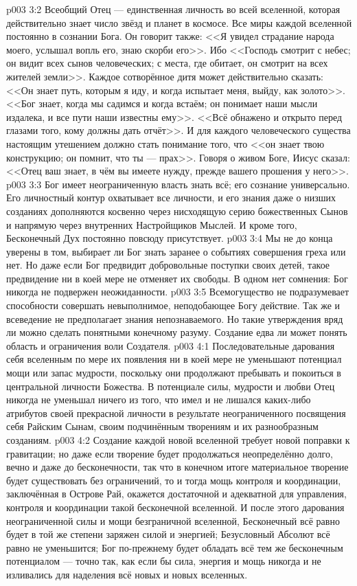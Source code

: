 \vs p003 3:2 Всеобщий Отец --- единственная личность во всей вселенной, которая действительно знает число звёзд и планет в космосе. Все миры каждой вселенной постоянно в сознании Бога. Он говорит также: <<Я увидел страдание народа моего, услышал вопль его, знаю скорби его>>. Ибо <<Господь смотрит с небес; он видит всех сынов человеческих; с места, где обитает, он смотрит на всех жителей земли>>. Каждое сотворённое дитя может действительно сказать: <<Он знает путь, которым я иду, и когда испытает меня, выйду, как золото>>. <<Бог знает, когда мы садимся и когда встаём; он понимает наши мысли издалека, и все пути наши известны ему>>. <<Всё обнажено и открыто перед глазами того, кому должны дать отчёт>>. И для каждого человеческого существа настоящим утешением должно стать понимание того, что <<он знает твою конструкцию; он помнит, что ты --- прах>>. Говоря о живом Боге, Иисус сказал: <<Отец ваш знает, в чём вы имеете нужду, прежде вашего прошения у него>>.
\vs p003 3:3 Бог имеет неограниченную власть знать всё; его сознание универсально. Его личностный контур охватывает все личности, и его знания даже о низших созданиях дополняются косвенно через нисходящую серию божественных Сынов и напрямую через внутренних Настройщиков Мыслей. И кроме того, Бесконечный Дух постоянно повсюду присутствует.
\vs p003 3:4 Мы не до конца уверены в том, выбирает ли Бог знать заранее о событиях совершения греха или нет. Но даже если Бог предвидит добровольные поступки своих детей, такое предвидение ни в коей мере не отменяет их свободы. В одном нет сомнения: Бог никогда не подвержен неожиданности.
\vs p003 3:5 \pc Всемогущество не подразумевает способности совершать невыполнимое, неподобающее Богу действие. Так же и всеведение не предполагает знания непознаваемого. Но такие утверждения вряд ли можно сделать понятными конечному разуму. Создание едва ли может понять область и ограничения воли Создателя.
\vs p003 4:1 Последовательные дарования себя вселенным по мере их появления ни в коей мере не уменьшают потенциал мощи или запас мудрости, поскольку они продолжают пребывать и покоиться в центральной личности Божества. В потенциале силы, мудрости и любви Отец никогда не уменьшал ничего из того, что имел и не лишался каких\hyp{}либо атрибутов своей прекрасной личности в результате неограниченного посвящения себя Райским Сынам, своим подчинённым творениям и их разнообразным созданиям.
\vs p003 4:2 Создание каждой новой вселенной требует новой поправки к гравитации; но даже если творение будет продолжаться неопределённо долго, вечно и даже до бесконечности, так что в конечном итоге материальное творение будет существовать без ограничений, то и тогда мощь контроля и координации, заключённая в Острове Рай, окажется достаточной и адекватной для управления, контроля и координации такой бесконечной вселенной. И после этого дарования неограниченной силы и мощи безграничной вселенной, Бесконечный всё равно будет в той же степени заряжен силой и энергией; Безусловный Абсолют всё равно не уменьшится; Бог по\hyp{}прежнему будет обладать всё тем же бесконечным потенциалом --- точно так, как если бы сила, энергия и мощь никогда и не изливались для наделения всё новых и новых вселенных.
